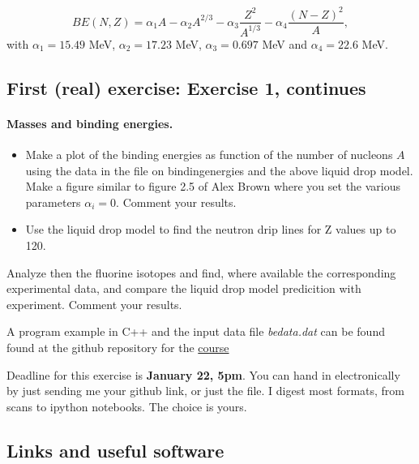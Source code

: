 \documentclass[%
oneside,                 %
final,                   %
10pt]{article}
\begin{document}
\noindent
\[
BE(N,Z)= \alpha_1A-\alpha_2A^{2/3}-\alpha_3\frac{Z^2}{A^{1/3}}-\alpha_4\frac{(N-Z)^2}{A},
\]
with $\alpha_1=15.49$ MeV, $\alpha_2=17.23$ MeV, $\alpha_3=0.697$ MeV and $\alpha_4=22.6$ MeV.





\subsection*{First (real) exercise: Exercise 1, continues}

\paragraph{Masses and binding energies.}
\begin{itemize}
 \item Make a plot of the binding energies as function of the number of nucleons $A$ using the data in the file on bindingenergies and the above liquid drop model.  Make a figure similar to figure 2.5 of Alex Brown where you set the various parameters $\alpha_i=0$. Comment your results. 

 \item Use the liquid drop model to find the neutron drip lines   for Z values up to 120.
\end{itemize}

\noindent
Analyze then the fluorine isotopes and find, where available the corresponding experimental data, and compare the liquid drop model predicition with experiment. 
Comment your results.

A program example in C++ and the input data file \emph{bedata.dat} can be found found at the github repository for the \href{{https://github.com/NuclearStructure/PHY981/tree/master/doc/pub/spdata/programs}}{course}

Deadline for this exercise is \textbf{January 22, 5pm}.  You can hand in electronically by just sending me your github link, or just the file. I digest most formats, from scans to ipython notebooks. The choice is yours.






\subsection*{Links and useful software}
\end{document}
